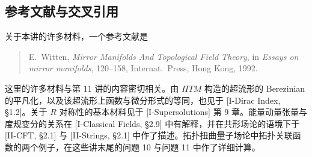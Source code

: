 
\subsection*{参考文献与交叉引用}

关于本讲的许多材料，一个参考文献是

\begin{quote}
E.~Witten, \emph{Mirror Manifolds And Topological Field Theory}, in \emph{Essays on mirror manifolds}, 120--158, Internat.\ Press, Hong Kong, 1992.
\end{quote}

这里的许多材料与第 11 讲的内容密切相关。由 $\Pi TM$ 构造的超流形的 Berezinian 的平凡化，以及该超流形上函数与微分形式的等同，也见于 [I-Dirac Index, §1.2]。关于 $R$ 对称性的基本材料见于 [I-Supersolutions] 第 9 章。能量动量张量与度规变分的关系在 [I-Classical Fields, §2.9] 中有解释，并在共形场论的语境下于 [II-CFT, §2.1] 与 [II-Strings, §2.1] 中作了描述。拓扑扭曲量子场论中拓扑关联函数的两个例子，在这些讲末尾的问题 10 与问题 11 中作了详细计算。

